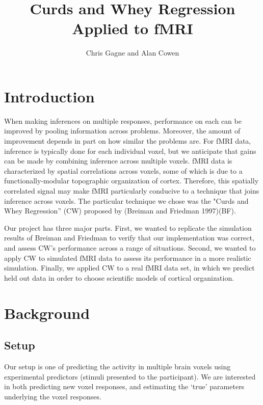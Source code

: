 \documentclass{article}
\title{Curds and Whey Regression Applied to
fMRI}
\author{Chris Gagne and Alan Cowen}
\begin{document}
    
    
    \maketitle
    
    

    



    

\section{Introduction}\label{introduction}

When making inferences on multiple responses, performance on each
can be improved by pooling information across problems. Moreover, the
amount of improvement depends in part on how similar the problems are.
For fMRI data, inference is typically done for each individual voxel,
but we anticipate that gains can be made by combining inference across
multiple voxels. fMRI data is characterized by spatial correlations
across voxels, some of which is due to a functionally-modular
topographic organization of cortex. Therefore, this spatially correlated
signal may make fMRI particularly conducive to a technique that joins
inference across voxels. The particular technique we chose was the
"Curds and Whey Regression'' (CW) proposed by (Breiman and Friedman
1997)(BF).

Our project has three major parts. First, we wanted to replicate the
simulation results of Breiman and Friedman to verify that our
implementation was correct, and assess CW's performance across a range
of situations. Second, we wanted to apply CW to simulated fMRI data to
assess its performance in a more realistic simulation. Finally, we
applied CW to a real fMRI data set, in which we predict held out data in
order to choose scientific models of cortical organization.

\section{Background}\label{background}

\subsection{Setup}\label{setup}

Our setup is one of predicting the activity in multiple brain voxels
using experimental predictors (stimuli presented to the
participant). We are interested in both predicting new voxel responses,
and estimating the `true' parameters underlying the voxel responses.
\end{document}
